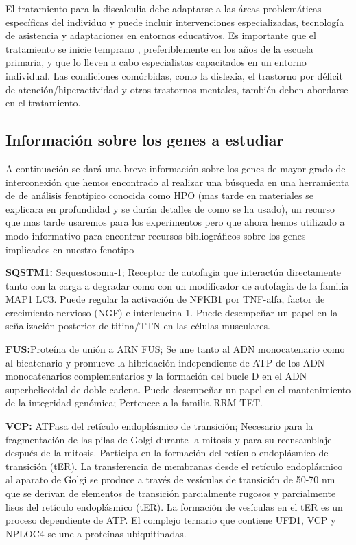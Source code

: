 \hfill

El tratamiento para la discalculia debe adaptarse a las áreas problemáticas específicas del individuo y puede incluir intervenciones  especializadas, tecnología de asistencia y adaptaciones en entornos educativos. Es importante que el tratamiento se inicie temprano \cite{ManagementDis}, preferiblemente en los años de la escuela primaria, y que lo lleven a cabo especialistas capacitados en un entorno individual. Las condiciones comórbidas, como la dislexia, el trastorno por déficit de atención/hiperactividad y otros trastornos mentales, también deben abordarse en el tratamiento.

\hfill

\subsection{Información sobre los genes a estudiar}


A continuación se dará una breve información sobre los genes de mayor grado de interconexión que hemos encontrado al realizar una búsqueda en una herramienta de de análisis fenotípico conocida como HPO \cite{HPO_paper} (mas tarde en materiales se explicara en profundidad y se darán detalles de como se ha usado), un recurso que mas tarde usaremos para los experimentos pero que ahora hemos utilizado a modo informativo para encontrar recursos bibliográficos sobre los genes implicados en nuestro fenotipo

\hfill

\textbf{SQSTM1\cite{SQSTM1}:} Sequestosoma-1; Receptor de autofagia que interactúa directamente tanto con la carga a degradar como con un modificador de autofagia de la familia MAP1 LC3. Puede regular la activación de NFKB1 por TNF-alfa, factor de crecimiento nervioso (NGF) e interleucina-1. Puede desempeñar un papel en la señalización posterior de titina/TTN en las células musculares.

\hfill

\textbf{FUS\cite{FUS}:}Proteína de unión a ARN FUS; Se une tanto al ADN monocatenario como al bicatenario y promueve la hibridación independiente de ATP de los ADN monocatenarios complementarios y la formación del bucle D en el ADN superhelicoidal de doble cadena. Puede desempeñar un papel en el mantenimiento de la integridad genómica; Pertenece a la familia RRM TET.

\hfill

\textbf{VCP\cite{VCP}:} ATPasa del retículo endoplásmico de transición; Necesario para la fragmentación de las pilas de Golgi durante la mitosis y para su reensamblaje después de la mitosis. Participa en la formación del retículo endoplásmico de transición (tER). La transferencia de membranas desde el retículo endoplásmico al aparato de Golgi se produce a través de vesículas de transición de 50-70 nm que se derivan de elementos de transición parcialmente rugosos y parcialmente lisos del retículo endoplásmico (tER). La formación de vesículas en el tER es un proceso dependiente de ATP. El complejo ternario que contiene UFD1, VCP y NPLOC4 se une a proteínas ubiquitinadas.

